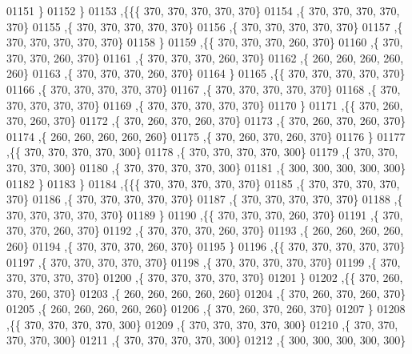 \begin{DoxyCode}
01151    \}
01152   \}
01153  ,\{\{\{   370,   370,   370,   370,   370\}
01154    ,\{   370,   370,   370,   370,   370\}
01155    ,\{   370,   370,   370,   370,   370\}
01156    ,\{   370,   370,   370,   370,   370\}
01157    ,\{   370,   370,   370,   370,   370\}
01158    \}
01159   ,\{\{   370,   370,   370,   260,   370\}
01160    ,\{   370,   370,   370,   260,   370\}
01161    ,\{   370,   370,   370,   260,   370\}
01162    ,\{   260,   260,   260,   260,   260\}
01163    ,\{   370,   370,   370,   260,   370\}
01164    \}
01165   ,\{\{   370,   370,   370,   370,   370\}
01166    ,\{   370,   370,   370,   370,   370\}
01167    ,\{   370,   370,   370,   370,   370\}
01168    ,\{   370,   370,   370,   370,   370\}
01169    ,\{   370,   370,   370,   370,   370\}
01170    \}
01171   ,\{\{   370,   260,   370,   260,   370\}
01172    ,\{   370,   260,   370,   260,   370\}
01173    ,\{   370,   260,   370,   260,   370\}
01174    ,\{   260,   260,   260,   260,   260\}
01175    ,\{   370,   260,   370,   260,   370\}
01176    \}
01177   ,\{\{   370,   370,   370,   370,   300\}
01178    ,\{   370,   370,   370,   370,   300\}
01179    ,\{   370,   370,   370,   370,   300\}
01180    ,\{   370,   370,   370,   370,   300\}
01181    ,\{   300,   300,   300,   300,   300\}
01182    \}
01183   \}
01184  ,\{\{\{   370,   370,   370,   370,   370\}
01185    ,\{   370,   370,   370,   370,   370\}
01186    ,\{   370,   370,   370,   370,   370\}
01187    ,\{   370,   370,   370,   370,   370\}
01188    ,\{   370,   370,   370,   370,   370\}
01189    \}
01190   ,\{\{   370,   370,   370,   260,   370\}
01191    ,\{   370,   370,   370,   260,   370\}
01192    ,\{   370,   370,   370,   260,   370\}
01193    ,\{   260,   260,   260,   260,   260\}
01194    ,\{   370,   370,   370,   260,   370\}
01195    \}
01196   ,\{\{   370,   370,   370,   370,   370\}
01197    ,\{   370,   370,   370,   370,   370\}
01198    ,\{   370,   370,   370,   370,   370\}
01199    ,\{   370,   370,   370,   370,   370\}
01200    ,\{   370,   370,   370,   370,   370\}
01201    \}
01202   ,\{\{   370,   260,   370,   260,   370\}
01203    ,\{   260,   260,   260,   260,   260\}
01204    ,\{   370,   260,   370,   260,   370\}
01205    ,\{   260,   260,   260,   260,   260\}
01206    ,\{   370,   260,   370,   260,   370\}
01207    \}
01208   ,\{\{   370,   370,   370,   370,   300\}
01209    ,\{   370,   370,   370,   370,   300\}
01210    ,\{   370,   370,   370,   370,   300\}
01211    ,\{   370,   370,   370,   370,   300\}
01212    ,\{   300,   300,   300,   300,   300\}

\end{DoxyCode}
